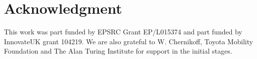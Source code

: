 \documentclass[conference]{IEEEtran}
\begin{document}
%



%





\section*{Acknowledgment}
This work was part funded by EPSRC Grant EP/L015374 and part funded by InnovateUK grant 104219. 
We are also grateful to W. Chernikoff, Toyota Mobility Foundation and The Alan Turing Institute for support in the initial stages.
\end{document}
